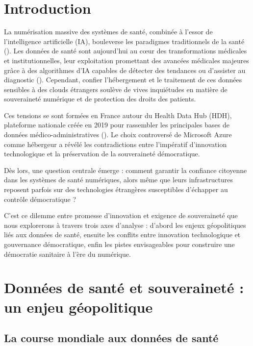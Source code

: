 \documentclass[10pt,a4paper]{article}
\begin{document}
\section{Introduction}

La numérisation massive des systèmes de santé, combinée à l'essor de l'intelligence artificielle (IA), bouleverse les paradigmes traditionnels de la santé (\cite{OCDE2021HealthDigitalAgeParis}). Les données de santé sont aujourd’hui au cœur des transformations médicales et institutionnelles, leur exploitation promettant des avancées médicales majeures grâce à des algorithmes d'IA capables de détecter des tendances ou d'assister au diagnostic (\cite{Villani2018DonnerUnSensIA}). Cependant, confier l'hébergement et le traitement de ces données sensibles à des clouds étrangers soulève de vives inquiétudes en matière de souveraineté numérique et de protection des droits des patients.

Ces tensions se sont formées en France autour du Health Data Hub (HDH), plateforme nationale créée en 2019 pour rassembler les principales bases de données médico-administratives (\cite{zins2021donnees}). Le choix controversé de Microsoft Azure comme hébergeur a révélé les contradictions entre l'impératif d'innovation technologique et la préservation de la souveraineté démocratique.

Dès lors, une question centrale émerge : comment garantir la confiance citoyenne dans les systèmes de santé numériques, alors même que leurs infrastructures reposent parfois sur des technologies étrangères susceptibles d’échapper au contrôle démocratique  ? 

C’est ce dilemme entre promesse d’innovation et exigence de souveraineté que nous explorerons à travers trois axes d’analyse : d'abord les enjeux géopolitiques liés aux données de santé, ensuite les conflits entre innovation technologique et gouvernance démocratique, enfin les pistes envisageables pour construire une démocratie sanitaire à l’ère du numérique.

\section{Données de santé et souveraineté : un enjeu géopolitique}

\subsection{La course mondiale aux données de santé}
\end{document}
